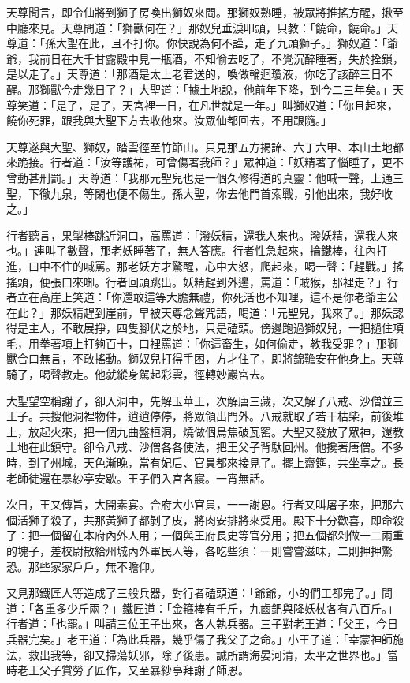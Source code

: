 天尊聞言，即令仙將到獅子房喚出獅奴來問。那獅奴熟睡，被眾將推搖方醒，揪至中廳來見。天尊問道：「獅獸何在？」那奴兒垂淚叩頭，只教：「饒命，饒命。」天尊道：「孫大聖在此，且不打你。你快說為何不謹，走了九頭獅子。」獅奴道：「爺爺，我前日在大千甘露殿中見一瓶酒，不知偷去吃了，不覺沉醉睡著，失於拴鎖，是以走了。」天尊道：「那酒是太上老君送的，喚做輪迴瓊液，你吃了該醉三日不醒。那獅獸今走幾日了？」大聖道：「據土地說，他前年下降，到今二三年矣。」天尊笑道：「是了，是了，天宮裡一日，在凡世就是一年。」叫獅奴道：「你且起來，饒你死罪，跟我與大聖下方去收他來。汝眾仙都回去，不用跟隨。」

天尊遂與大聖、獅奴，踏雲徑至竹節山。只見那五方揭諦、六丁六甲、本山土地都來跪接。行者道：「汝等護祐，可曾傷著我師？」眾神道：「妖精著了惱睡了，更不曾動甚刑罰。」天尊道：「我那元聖兒也是一個久修得道的真靈：他喊一聲，上通三聖，下徹九泉，等閑也便不傷生。孫大聖，你去他門首索戰，引他出來，我好收之。」

行者聽言，果掣棒跳近洞口，高罵道：「潑妖精，還我人來也。潑妖精，還我人來也。」連叫了數聲，那老妖睡著了，無人答應。行者性急起來，掄鐵棒，往內打進，口中不住的喊罵。那老妖方才驚醒，心中大怒，爬起來，喝一聲：「趕戰。」搖搖頭，便張口來啣。行者回頭跳出。妖精趕到外邊，罵道：「賊猴，那裡走？」行者立在高崖上笑道：「你還敢這等大膽無禮，你死活也不知哩，這不是你老爺主公在此？」那妖精趕到崖前，早被天尊念聲咒語，喝道：「元聖兒，我來了。」那妖認得是主人，不敢展掙，四隻腳伏之於地，只是磕頭。傍邊跑過獅奴兒，一把撾住項毛，用拳著項上打夠百十，口裡罵道：「你這畜生，如何偷走，教我受罪？」那獅獸合口無言，不敢搖動。獅奴兒打得手困，方才住了，即將錦韂安在他身上。天尊騎了，喝聲教走。他就縱身駕起彩雲，徑轉妙巖宮去。

大聖望空稱謝了，卻入洞中，先解玉華王，次解唐三藏，次又解了八戒、沙僧並三王子。共搜他洞裡物件，逍逍停停，將眾領出門外。八戒就取了若干枯柴，前後堆上，放起火來，把一個九曲盤桓洞，燒做個烏焦破瓦窰。大聖又發放了眾神，還教土地在此鎮守。卻令八戒、沙僧各各使法，把王父子背馱回州。他攙著唐僧。不多時，到了州城，天色漸晚，當有妃后、官員都來接見了。擺上齋筵，共坐享之。長老師徒還在暴紗亭安歇。王子們入宮各寢。一宵無話。

次日，王又傳旨，大開素宴。合府大小官員，一一謝恩。行者又叫屠子來，把那六個活獅子殺了，共那黃獅子都剝了皮，將肉安排將來受用。殿下十分歡喜，即命殺了：把一個留在本府內外人用；一個與王府長史等官分用；把五個都剁做一二兩重的塊子，差校尉散給州城內外軍民人等，各吃些須：一則嘗嘗滋味，二則押押驚恐。那些家家戶戶，無不瞻仰。

又見那鐵匠人等造成了三般兵器，對行者磕頭道：「爺爺，小的們工都完了。」問道：「各重多少斤兩？」鐵匠道：「金箍棒有千斤，九齒鈀與降妖杖各有八百斤。」行者道：「也罷。」叫請三位王子出來，各人執兵器。三子對老王道：「父王，今日兵器完矣。」老王道：「為此兵器，幾乎傷了我父子之命。」小王子道：「幸蒙神師施法，救出我等，卻又掃蕩妖邪，除了後患。誠所謂海晏河清，太平之世界也。」當時老王父子賞勞了匠作，又至暴紗亭拜謝了師恩。

